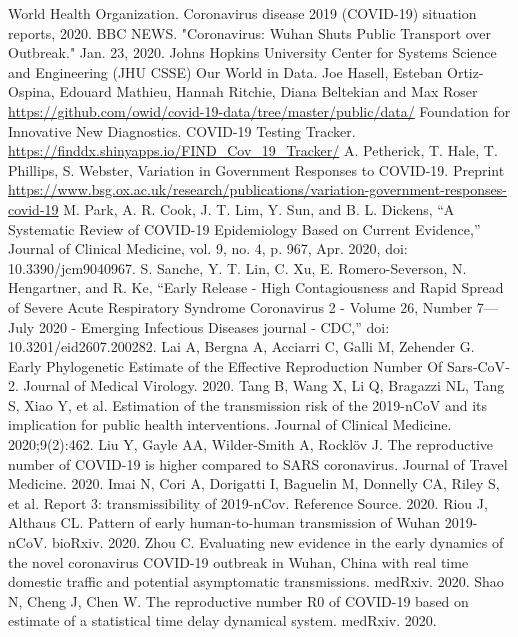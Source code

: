 \documentclass{article}
\begin{document}
\begin{thebibliography}{}
World Health Organization. Coronavirus disease 2019 (COVID-19) situation reports, 2020.
BBC NEWS. "Coronavirus: Wuhan Shuts Public Transport over Outbreak." Jan. 23, 2020.
Johns Hopkins University Center for Systems Science and Engineering (JHU CSSE)
Our World in Data. Joe Hasell, Esteban Ortiz-Ospina, Edouard Mathieu, Hannah Ritchie, Diana Beltekian and Max Roser \url{https://github.com/owid/covid-19-data/tree/master/public/data/}
Foundation for Innovative New Diagnostics. COVID-19 Testing Tracker. 
\url{https://finddx.shinyapps.io/FIND\_Cov\_19\_Tracker/}
A. Petherick, T. Hale, T. Phillips, S. Webster, Variation in Government Responses to COVID-19. Preprint
\url{https://www.bsg.ox.ac.uk/research/publications/variation-government-responses-covid-19}
  M. Park, A. R. Cook, J. T. Lim, Y. Sun, and B. L. Dickens, “A Systematic Review of COVID-19 Epidemiology Based on Current Evidence,” Journal of Clinical Medicine, vol. 9, no. 4, p. 967, Apr. 2020, doi: 10.3390/jcm9040967.
  S. Sanche, Y. T. Lin, C. Xu, E. Romero-Severson, N. Hengartner, and R. Ke, “Early Release - High Contagiousness and Rapid Spread of Severe Acute Respiratory Syndrome Coronavirus 2 - Volume 26, Number 7—July 2020 - Emerging Infectious Diseases journal - CDC,” doi: 10.3201/eid2607.200282.
Lai A, Bergna A, Acciarri C, Galli M, Zehender G. Early Phylogenetic Estimate of the Effective Reproduction Number Of Sars‐CoV‐2. Journal of Medical Virology. 2020.
Tang B, Wang X, Li Q, Bragazzi NL, Tang S, Xiao Y, et al. Estimation of the transmission risk of the 2019-nCoV and its implication for public health interventions. Journal of Clinical Medicine. 2020;9(2):462.
Liu Y, Gayle AA, Wilder-Smith A, Rocklöv J. The reproductive number of COVID-19 is higher compared to SARS coronavirus. Journal of Travel Medicine. 2020.
Imai N, Cori A, Dorigatti I, Baguelin M, Donnelly CA, Riley S, et al. Report 3: transmissibility of 2019-nCov. Reference Source. 2020.
Riou J, Althaus CL. Pattern of early human-to-human transmission of Wuhan 2019-nCoV. bioRxiv. 2020.
Zhou C. Evaluating new evidence in the early dynamics of the novel coronavirus COVID-19 outbreak in Wuhan, China with real time domestic traffic and potential asymptomatic transmissions. medRxiv. 2020.
Shao N, Cheng J, Chen W. The reproductive number R0 of COVID-19 based on estimate of a statistical time delay dynamical system. medRxiv. 2020.

\end{thebibliography}
\end{document}
